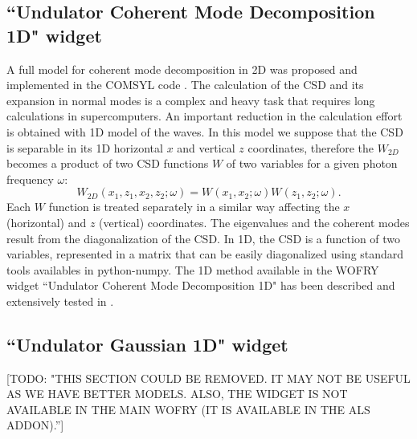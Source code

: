 \documentclass{iopconfser}
\newcommand{\todo}[1]{{\color{red}[TODO: "#1'']}}
\begin{document}
\subsection{``Undulator Coherent Mode Decomposition 1D" widget}
\label{sec:CMD}

A full model for coherent mode decomposition in 2D was proposed and implemented in the COMSYL code \cite{glass2017}. The calculation of the CSD and its expansion in normal modes is a complex and heavy task that requires long calculations in supercomputers. 
An important reduction in the calculation effort is obtained with 1D model of the waves. In this model we suppose that the CSD is separable in its 1D horizontal $x$ and vertical $z$ coordinates, therefore the $W_{2D}$ becomes a product of two CSD functions $W$ of two variables for a given photon frequency $\omega$:
\begin{equation}
W_{2D}(x_1,z_1,x_2,z_2;\omega) = W(x_1,x_2;\omega) W(z_1,z_2;\omega).
\label{eq:CSD_2D}
\end{equation}
Each $W$ function is treated separately in a similar way affecting the $x$ (horizontal) and $z$ (vertical) coordinates.
The eigenvalues and the coherent modes result from the diagonalization of the CSD.  In 1D, the CSD is a function of two variables, represented in a matrix that can be easily diagonalized using standard tools availables in python-numpy. 
The 1D method  available in the WOFRY widget ``Undulator Coherent Mode Decomposition 1D" has been described and extensively tested in \cite{SanchezdelRio2022CMD}.

\subsection{``Undulator Gaussian 1D" widget} \todo{THIS SECTION COULD BE REMOVED. IT MAY NOT BE USEFUL AS WE HAVE BETTER MODELS. ALSO, THE WIDGET IS NOT AVAILABLE IN THE MAIN WOFRY (IT IS AVAILABLE IN THE ALS ADDON).}
\label{sec:undulatorG}
\end{document}
